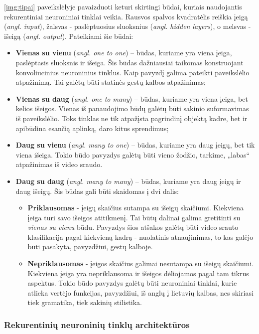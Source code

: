 \documentclass{VUMIFPSbakalaurinis}
\begin{document}
\ref{img:tipai} paveikslėlyje pavaizduoti keturi skirtingi būdai, kuriais naudojantis rekurentiniai neuroniniai tinklai veikia. Rausvos spalvos kvadratėlis reiškia įeigą (\textit{angl. input}), žalsvas - paslėptuosius sluoksnius (\textit{angl. hidden layers}), o melsvas - išeigą (\textit{angl. output}). Pateikiami šie būdai:

\begin{itemize}
	\item \textbf{Vienas su vienu} (\textit{angl. one to one}) – būdas, kuriame yra viena įeiga, paslėptasis sluoksnis ir išeiga. Šis būdas dažniausiai taikomas konstruojant konvoliucinius neuroninius tinklus. Kaip pavyzdį galima pateikti paveikslėlio atpažinimą. Tai galėtų būti statinės gestų kalbos atpažinimas;
	\item \textbf{Vienas su daug} (\textit{angl. one to many}) – būdas, kuriame yra viena įeiga, bet kelios išeigos. Vienas iš panaudojimo būdų galėtų būti sakinio suformavimas iš paveikslėlio. Toks tinklas ne tik atpažįsta pagrindinį objektą kadre, bet ir apibūdina esančią aplinką, daro kitus sprendimus;
	\item \textbf{Daug su vienu} (\textit{angl. many to one}) – būdas, kuriame yra daug įeigų, bet tik viena išeiga. Tokio būdo pavyzdys galėtų būti vieno žodžio, tarkime, „labas“ atpažinimas iš video sraudo.
	\item \textbf{Daug su daug} (\textit{angl. many to many}) – būdas, kuriame yra daug įeigų ir daug išeigų. Šis būdas gali būti skaidomas į dvi dalis:
	\begin{itemize}
		\item \textbf{Priklausomas} - įeigų skaičius sutampa su išeigų skaičiumi. Kiekviena įeiga turi savo išeigos atitikmenį. Tai būtų dalinai galima gretitinti su \textit{vienas su vienu} būdu. Pavyzdys šios atšakos galėtų būti video srauto klasifikacija pagal kiekvieną kadrą - nuolatinis atnaujinimas, to kas galėjo būti pasakyta, pavyzdžiui, gestų kalboje.
		\item \textbf{Nepriklausomas} - įeigos skaičius galimai nesutampa su išeigų skaičiumi. Kiekviena įeiga yra nepriklausoma ir išeigos dėliojamos pagal tam tikrus aspektus. Tokio būdo pavyzdys galėtų būti neuroniniai tinklai, kurie atlieka vertėjo funkcijas, pavyzdžiui, iš anglų į lietuvių kalbas, nes skiriasi tiek gramatika, tiek sakinių stilistika.
	\end{itemize}
\end{itemize}

\subsubsection{Rekurentinių neuroninių tinklų architektūros}
\end{document}
